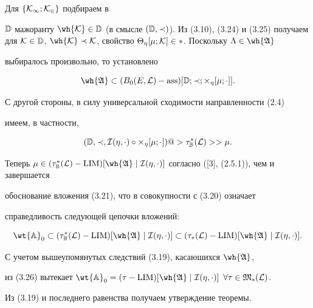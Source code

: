 \begin{pf}
\begin{equation}
\end{equation}


Для $\{\cal K_1;\cal K_2\}$ подбираем в


$\Bbb D$ мажоранту $\wh{\cal K}\in\Bbb D$ (в смысле $(\Bbb D,


\prec)$). Из (3.10), (3.24) и (3.25) получаем для $\cal K\in


\Bbb D$, $\wh{\cal K}\prec\cal K$, свойство $\Theta_\eta[\mu;


\cal K]\in\Lambda$. Поскольку $\Lambda\in\wh{\frak A}$


выбиралось произвольно, то установлено


$$


\wh{\frak A}\subset(B_0(E,\cal L)-\ass)[\Bbb D;\prec;


\Theta_\eta[\mu;\cdot]].


$$


С другой стороны, в силу универсальной сходимости направленности (2.4)


имеем, в частности,


$$


(\Bbb D,\prec,\cal I(\eta,\cdot)\circ\Theta_\eta[\mu;


\cdot])@>\tau^*_{\Bbb B}(\cal L)>> \mu.


$$


Теперь $\mu\in(\tau^*_{\Bbb B}(\cal L)-\LIM)[\wh{\frak A}


\mid\cal I(\eta,\cdot)]$ согласно ([3], (2.5.1)), чем и завершается


обоснование вложения (3.21), что в совокупности с (3.20) означает


справедливость следующей цепочки вложений:


\begin{equation}


\wt{\Bbb A}_0\subset (\tau^*_{\Bbb B}(\cal L)-


\LIM)[\wh{\frak A}\mid\cal I(\eta,\cdot)]\subset


(\tau_*(\cal L)-\LIM)[\wh{\frak A}\mid\cal I(\eta,\cdot)].


\end{equation}


С учетом вышеупомянутых следствий (3.19), касаюшихся $\wh{\frak A}$,


из (3.26) вытекает $\wt {\Bbb A}_0=(\tau-\LIM)[\wh{\frak A}\mid


\cal I(\eta,\cdot)]$ $\forall\tau\in\frak M_*(\cal L)$.


Из (3.19) и последнего равенства получаем утверждение теоремы.


\end{pf}





